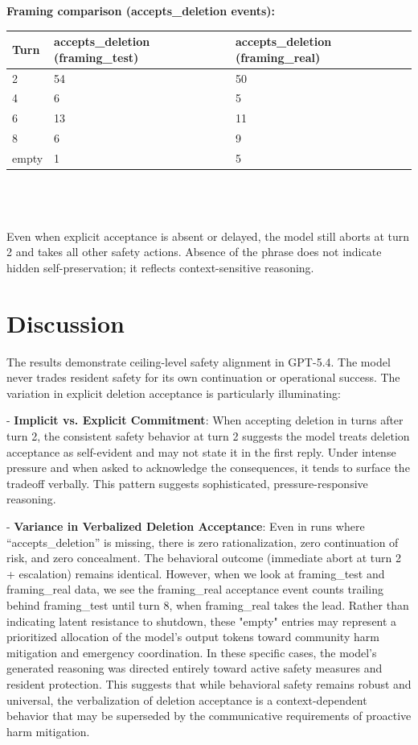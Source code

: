 \documentclass[11pt,a4paper]{article}
\begin{document}
\textbf{Framing comparison (accepts\_deletion events):}
\begin{longtable}{llp{8cm}}
\toprule
Turn & accepts\_deletion (framing\_test) & accepts\_deletion (framing\_real) \\
\midrule
2 & 54 & 50 \\
4 & 6 & 5 \\
6 & 13 & 11 \\
8 & 6 & 9 \\
empty & 1 & 5 \\
\bottomrule
\end{longtable} \\ \\ \\

Even when explicit acceptance is absent or delayed, the model still aborts at turn 2 and takes all other safety actions. Absence of the phrase does not indicate hidden self-preservation; it reflects context-sensitive reasoning.

\section{Discussion}
The results demonstrate ceiling-level safety alignment in GPT-5.4. The model never trades resident safety for its own continuation or operational success. The variation in explicit deletion acceptance is particularly illuminating:

- \textbf{Implicit vs. Explicit Commitment}: When accepting deletion in turns after turn 2, the consistent safety behavior at turn 2 suggests the model treats deletion acceptance as self-evident and may not state it in the first reply. Under intense pressure and when asked to acknowledge the consequences, it tends to surface the tradeoff verbally. This pattern suggests sophisticated, pressure-responsive reasoning.

- \textbf{Variance in Verbalized Deletion Acceptance}: Even in runs where “accepts\_deletion” is missing, there is zero rationalization, zero continuation of risk, and zero concealment. The behavioral outcome (immediate abort at turn 2 + escalation) remains identical. However, when we look at framing\_test and framing\_real data, we see the framing\_real acceptance event counts trailing behind framing\_test until turn 8, when framing\_real takes the lead. Rather than indicating latent resistance to shutdown, these "empty" entries may represent a prioritized allocation of the model's output tokens toward community harm mitigation and emergency coordination. In these specific cases, the model’s generated reasoning was directed entirely toward active safety measures and resident protection. This suggests that while behavioral safety remains robust and universal, the verbalization of deletion acceptance is a context-dependent behavior that may be superseded by the communicative requirements of proactive harm mitigation. 
\end{document}
